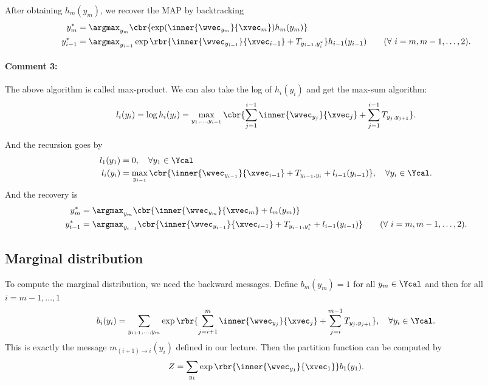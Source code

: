 \documentclass[11pt]{report}
\begin{document}
After obtaining $h_m(y_m)$, we recover the MAP by backtracking
\begin{align}
	y^*_m &= \argmax_{y_m} \cbr{ \exp(\inner{\wvec_{y_m}}{\xvec_m}) h_m(y_m)} \\
	y^*_{i-1} &= \argmax_{y_{i-1}} \exp \rbr{\inner{\wvec_{y_{i-1}}}{\xvec_{i-1}} + T_{y_{i-1}, y^*_i}}  h_{i-1}(y_{i-1})  \qquad (\forall\ i = m, m-1, \ldots, 2).
\end{align}

\paragraph{Comment 3:}
The above algorithm is called max-product.
We can also take the log of $h_i(y_i)$ and get the max-sum algorithm:
\begin{align}
	l_i(y_i) = \log h_i(y_i) = \max_{y_1, \ldots, y_{i-1}} \cbr{\sum_{j=1}^{i-1} \inner{\wvec_{y_j}}{\xvec_j} + \sum_{j=1}^{i-1} T_{y_j, y_{j+1}}}.
\end{align}

And the recursion goes by
\begin{align}
	l_1(y_1) &= 0, \quad \forall y_1 \in \Ycal \\
	l_i(y_i) &= \max_{y_{i-1}} \cbr{\inner{\wvec_{y_{i-1}}}{\xvec_{i-1}} + T_{y_{i-1}, y_i} + l_{i-1}(y_{i-1})}, \quad \forall y_i \in \Ycal.
\end{align}
And the recovery is
\begin{align}
	y^*_m &= \argmax_{y_m} \cbr{ \inner{\wvec_{y_m}}{\xvec_m} + l_m(y_m)} \\
	y^*_{i-1} &= \argmax_{y_{i-1}} \cbr{ \inner{\wvec_{y_{i-1}}}{\xvec_{i-1}} + T_{y_{i-1}, y^*_i} + l_{i-1}(y_{i-1})}  \qquad (\forall\ i = m, m-1, \ldots, 2).
\end{align}

\subsection{Marginal distribution}
\label{sec:marginal}

To compute the marginal distribution, we need the backward messages.
Define $b_m(y_m) = 1$ for all $y_m \in \Ycal$ and then for all $i = m-1, \ldots, 1$
\begin{align}
	b_i(y_i) = \sum_{y_{i+1}, \ldots, y_{m}} \exp \rbr{\sum_{j=i+1}^m \inner{\wvec_{y_j}}{\xvec_j} + \sum_{j=i}^{m-1} T_{y_j, y_{j+1}}}, \quad \forall y_i \in \Ycal.
\end{align}
This is exactly the message $m_{(i+1) \to i} (y_i)$ defined in our lecture.
Then the partition function can be computed by
\begin{align}
	Z = \sum_{y_1} \exp \rbr{\inner{\wvec_{y_1}}{\xvec_1}} b_1(y_1).
\end{align}
\end{document}
